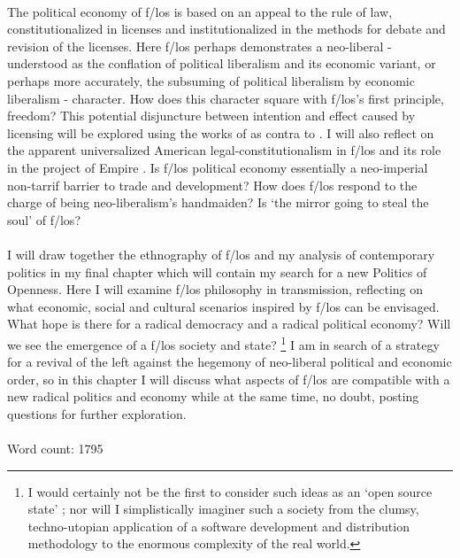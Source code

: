 \documentclass{article}
\begin{document}
\begin{doublespace}
\paragraph{}The political economy of f/los is based on an appeal to the rule of law, constitutionalized in licenses and institutionalized in the methods for debate and revision of the licenses. Here f/los perhaps demonstrates a neo-liberal - understood as the conflation of political liberalism and its economic variant, or perhaps more accurately, the subsuming of political liberalism by economic liberalism - character. How does this character square with f/los's first principle, freedom? This potential disjuncture between intention and effect caused by licensing will be explored using the works of  as contra to . I will also reflect on the apparent universalized American legal-constitutionalism in f/los and its role in the project of Empire \cite{Hardt:2001jl}. Is f/los political economy essentially a neo-imperial non-tarrif barrier to trade and development? How does f/los respond to the charge of being neo-liberalism's handmaiden? Is `the mirror going to steal the soul' of f/los? \cite{Prug:2006xr}

\paragraph{}I will draw together the ethnography of f/los and my analysis of contemporary politics in my final chapter which will contain my search for a new Politics of Openness. Here I will examine f/los philosophy in transmission, reflecting on what economic, social and cultural scenarios inspired by f/los can be envisaged. What hope is there for a radical democracy and a radical political economy? Will we see the emergence of a f/los society and state? \footnote{I would certainly not be the first to consider such ideas as an `open source state' ; nor will I simplistically imaginer such a society from the clumsy, techno-utopian application of a software development and distribution methodology to the enormous complexity of the real world.} I am in search of a strategy for a revival of the left \cite{Laclau:2001rt,Laclau:1990rc} against the hegemony of neo-liberal political and economic order, so in this chapter I will discuss what aspects of f/los are compatible with a new radical politics and economy while at the same time, no doubt, posting questions for further exploration.

\paragraph{}Word count: 1795

\end{doublespace}
\newpage

\end{document}
